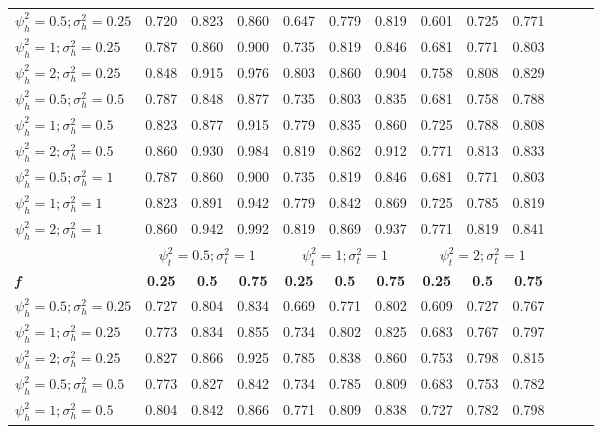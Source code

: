 \documentclass[AMA,STIX1COL,]{WileyNJD-v2}
\begin{document}
\begin{table}[ht]
{\begin{tabular}{l c c c c c c c c c c c c}
\hline
$\psi_h^2 = 0.5; \sigma_h^2 = 0.25$ & 0.720 & 0.823 & 0.860 & 0.647 & 0.779 & 0.819 & 0.601 & 0.725 & 0.771 \\
$\psi_h^2 = 1; \sigma_h^2 = 0.25$ & 0.787 & 0.860 & 0.900 & 0.735 & 0.819 & 0.846 & 0.681 & 0.771 & 0.803 \\
$\psi_h^2 = 2; \sigma_h^2 = 0.25$ & 0.848 & 0.915 & 0.976 & 0.803 & 0.860 & 0.904 & 0.758 & 0.808 & 0.829 \\
$\psi_h^2 = 0.5; \sigma_h^2 = 0.5$ & 0.787 & 0.848 & 0.877 & 0.735 & 0.803 & 0.835 & 0.681 & 0.758 & 0.788 \\
$\psi_h^2 = 1; \sigma_h^2 = 0.5$ & 0.823 & 0.877 & 0.915 & 0.779 & 0.835 & 0.860 & 0.725 & 0.788 & 0.808 \\
$\psi_h^2 = 2; \sigma_h^2 = 0.5$ & 0.860 & 0.930 & 0.984 & 0.819 & 0.862 & 0.912 & 0.771 & 0.813 & 0.833 \\
$\psi_h^2 = 0.5; \sigma_h^2 = 1$ & 0.787 & 0.860 & 0.900 & 0.735 & 0.819 & 0.846 & 0.681 & 0.771 & 0.803 \\
$\psi_h^2 = 1; \sigma_h^2 = 1$ & 0.823 & 0.891 & 0.942 & 0.779 & 0.842 & 0.869 & 0.725 & 0.785 & 0.819 \\
$\psi_h^2 = 2; \sigma_h^2 = 1$ & 0.860 & 0.942 & 0.992 & 0.819 & 0.869 & 0.937 & 0.771 & 0.819 & 0.841 \\
\hline 
 & \multicolumn{3}{c}{$\psi_t^2 = 0.5; \sigma_t^2 = 1$} & \multicolumn{3}{c}{$\psi_t^2 = 1; \sigma_t^2 = 1$} & \multicolumn{3}{c}{$\psi_t^2 = 2; \sigma_t^2 = 1$} \\
\addlinespace[1pt]
\cmidrule(lr){2-4} \cmidrule(lr){5-7} \cmidrule(lr){8-10}
\addlinespace[1pt]
\textbf{\textit{f}} & \textbf{0.25} & \textbf{0.5} & \textbf{0.75} & \textbf{0.25} & \textbf{0.5} & \textbf{0.75} & \textbf{0.25} & \textbf{0.5} & \textbf{0.75} \\
\hline
$\psi_h^2 = 0.5; \sigma_h^2 = 0.25$ & 0.727 & 0.804 & 0.834 & 0.669 & 0.771 & 0.802 & 0.609 & 0.727 & 0.767 \\
$\psi_h^2 = 1; \sigma_h^2 = 0.25$ & 0.773 & 0.834 & 0.855 & 0.734 & 0.802 & 0.825 & 0.683 & 0.767 & 0.797 \\
$\psi_h^2 = 2; \sigma_h^2 = 0.25$ & 0.827 & 0.866 & 0.925 & 0.785 & 0.838 & 0.860 & 0.753 & 0.798 & 0.815 \\
$\psi_h^2 = 0.5; \sigma_h^2 = 0.5$ & 0.773 & 0.827 & 0.842 & 0.734 & 0.785 & 0.809 & 0.683 & 0.753 & 0.782 \\
$\psi_h^2 = 1; \sigma_h^2 = 0.5$ & 0.804 & 0.842 & 0.866 & 0.771 & 0.809 & 0.838 & 0.727 & 0.782 & 0.798 \\

\end{tabular}}
\end{table}
\end{document}
